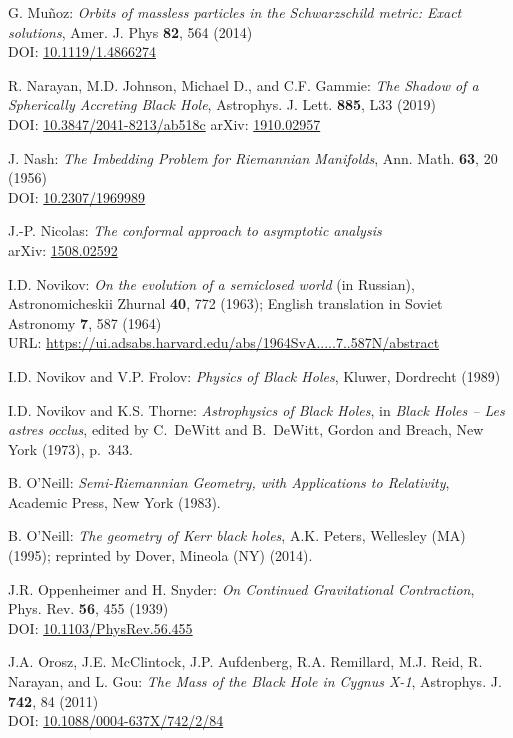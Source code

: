 \begin{thebibliography}{123}
G. Mu\~noz:
{\em Orbits of massless particles in the Schwarzschild metric: Exact solutions},
Amer. J. Phys {\bf 82}, 564 (2014)\\
DOI: \href{https://doi.org/10.1119/1.4866274}{10.1119/1.4866274}

R. Narayan, M.D. Johnson, Michael D., and C.F. Gammie:
{\em The Shadow of a Spherically Accreting Black Hole},
Astrophys. J. Lett. {\bf 885}, L33 (2019)\\
DOI: \href{https://doi.org/10.3847/2041-8213/ab518c}{10.3847/2041-8213/ab518c}\hfill
arXiv: \href{https://arxiv.org/abs/1910.02957}{1910.02957}

J. Nash:
{\em The Imbedding Problem for Riemannian Manifolds},
Ann. Math. {\bf 63}, 20 (1956)\\
DOI: \href{https://doi.org/10.2307/1969989}{10.2307/1969989}

J.-P. Nicolas:
{\em The conformal approach to asymptotic analysis} \\
arXiv: \href{https://arxiv.org/abs/1508.02592}{1508.02592}

I.D. Novikov:
{\em On the evolution of a semiclosed world} (in Russian),
Astronomicheskii Zhurnal {\bf 40}, 772 (1963); English translation in
Soviet Astronomy {\bf 7}, 587 (1964)\\
URL: \url{https://ui.adsabs.harvard.edu/abs/1964SvA.....7..587N/abstract}

I.D. Novikov and V.P. Frolov: {\em Physics of Black Holes},
Kluwer, Dordrecht (1989)

I.D. Novikov and K.S. Thorne: {\em Astrophysics of Black Holes},
in {\em Black Holes -- Les astres occlus},  edited by C.~DeWitt and B.~DeWitt,
Gordon and Breach, New York (1973), p.~343.

B. O'Neill: {\em Semi-Riemannian Geometry, with Applications to Relativity},
Academic Press, New York (1983).

B. O'Neill: {\em The geometry of Kerr black holes}, A.K. Peters, Wellesley (MA) (1995);
reprinted by Dover, Mineola (NY) (2014).

J.R. Oppenheimer and H. Snyder:
{\em On Continued Gravitational Contraction},
Phys. Rev. {\bf 56}, 455 (1939)\\
DOI: \href{https://doi.org/10.1103/PhysRev.56.455}{10.1103/PhysRev.56.455}

J.A. Orosz, J.E. McClintock, J.P. Aufdenberg, R.A. Remillard, M.J. Reid, R. Narayan, and L. Gou:
{\em The Mass of the Black Hole in Cygnus X-1},
Astrophys. J. {\bf 742}, 84 (2011)\\
DOI: \href{https://doi.org/10.1088/0004-637X/742/2/84}{10.1088/0004-637X/742/2/84}


\end{thebibliography}
